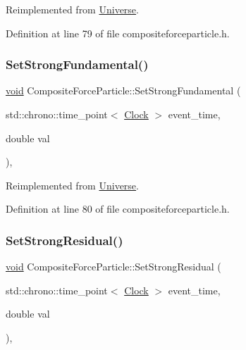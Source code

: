 Reimplemented from \mbox{\hyperlink{class_universe_a5946c8f3d4cda305f3ecd10df21a2f94}{Universe}}.



Definition at line 79 of file compositeforceparticle.\+h.

\mbox{\label{class_composite_force_particle_a28d835658edcbecf60162475a8cb1ab6}} 
\subsubsection{\texorpdfstring{Set\+Strong\+Fundamental()}{SetStrongFundamental()}}
{\footnotesize\ttfamily \mbox{\hyperlink{glad_8h_a950fc91edb4504f62f1c577bf4727c29}{void}} Composite\+Force\+Particle\+::\+Set\+Strong\+Fundamental (\begin{DoxyParamCaption}\item[{std\+::chrono\+::time\+\_\+point$<$ \mbox{\hyperlink{universe_8h_a0ef8d951d1ca5ab3cfaf7ab4c7a6fd80}{Clock}} $>$}]{event\+\_\+time,  }\item[{double}]{val }\end{DoxyParamCaption})\hspace{0.3cm}{\ttfamily [inline]}, {\ttfamily [virtual]}}



Reimplemented from \mbox{\hyperlink{class_universe_aafec97a231126b71c73ac1258609a284}{Universe}}.



Definition at line 80 of file compositeforceparticle.\+h.

\mbox{\label{class_composite_force_particle_aeba1070d4ec6e52fd8276e38c6a6c2e1}} 
\subsubsection{\texorpdfstring{Set\+Strong\+Residual()}{SetStrongResidual()}}
{\footnotesize\ttfamily \mbox{\hyperlink{glad_8h_a950fc91edb4504f62f1c577bf4727c29}{void}} Composite\+Force\+Particle\+::\+Set\+Strong\+Residual (\begin{DoxyParamCaption}\item[{std\+::chrono\+::time\+\_\+point$<$ \mbox{\hyperlink{universe_8h_a0ef8d951d1ca5ab3cfaf7ab4c7a6fd80}{Clock}} $>$}]{event\+\_\+time,  }\item[{double}]{val }\end{DoxyParamCaption})\hspace{0.3cm}{\ttfamily [inline]}, {\ttfamily [virtual]}}



